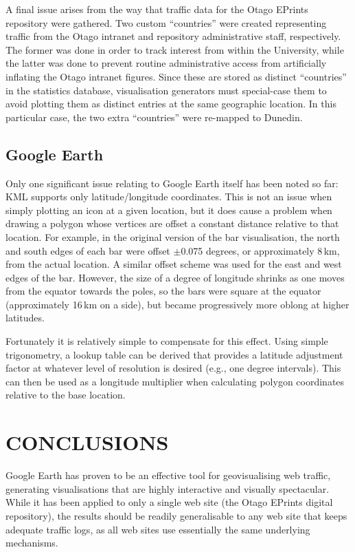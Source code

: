 \documentclass[10pt]{article}
\begin{document}
A final issue arises from the way that traffic data for the Otago EPrints repository were gathered. Two custom ``countries'' were created representing traffic from the Otago intranet and repository administrative staff, respectively. The former was done in order to track interest from within the University, while the latter was done to prevent routine administrative access from artificially inflating the Otago intranet figures. Since these are stored as distinct ``countries'' in the statistics database, visualisation generators must special-case them to avoid plotting them as distinct entries at the same geographic location. In this particular case, the two extra ``countries'' were re-mapped to Dunedin.


\subsection{Google Earth}

Only one significant issue relating to Google Earth itself has been noted so far: KML supports only latitude/longitude coordinates. This is not an issue when simply plotting an icon at a given location, but it does cause a problem when drawing a polygon whose vertices are offset a constant distance relative to that location. For example, in the original version of the bar visualisation, the north and south edges of each bar were offset \(\pm\)0.075 degrees, or approximately 8\,km, from the actual location. A similar offset scheme was used for the east and west edges of the bar. However, the size of a degree of longitude shrinks as one moves from the equator towards the poles, so the bars were square at the equator (approximately 16\,km on a side), but became progressively more oblong at higher latitudes.

Fortunately it is relatively simple to compensate for this effect. Using simple trigonometry, a lookup table can be derived that provides a latitude adjustment factor at whatever level of resolution is desired (e.g., one degree intervals). This can then be used as a longitude multiplier when calculating polygon coordinates relative to the base location.


\section{CONCLUSIONS}

Google Earth has proven to be an effective tool for geovisualising web traffic, generating visualisations that are highly interactive and visually spectacular. While it has been applied to only a single web site (the Otago EPrints digital repository), the results should be readily generalisable to any web site that keeps adequate traffic logs, as all web sites use essentially the same underlying mechanisms.
\end{document}
